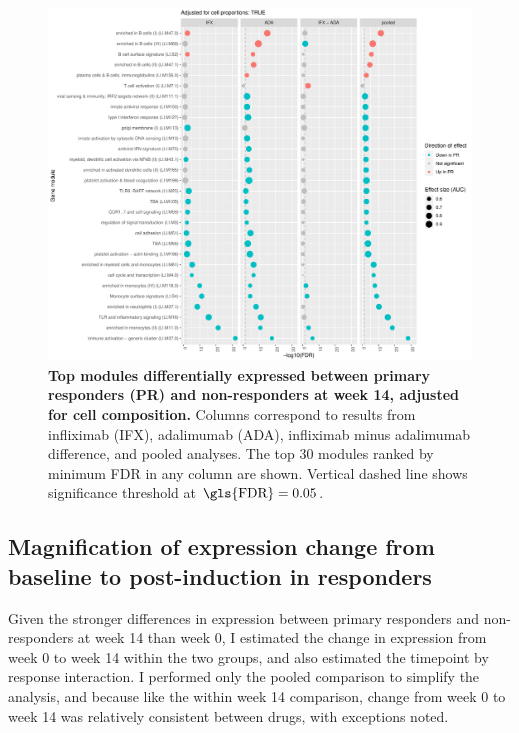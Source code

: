 \begin{figure}
    \centering
    \includegraphics[width=1.0\textwidth,page=1]{mainmatter/figures/chapter_04/plot_gene_set_enrichment.tmodCERNO_panelplot_reversed_C_3RI_3NI,C_3RA_3NA,C_(3RI_3NI)_(3RA_3NA),C_3R_3N.cell_prop_correction_TRUE.pdf}
    \caption{
        \textbf{Top modules differentially expressed between primary responders (PR) and non-responders at week 14, adjusted for cell composition.}
        Columns correspond to results from infliximab (IFX), adalimumab (ADA), infliximab minus adalimumab difference, and pooled analyses. 
        The top 30 modules ranked by minimum \gls{FDR} in any column are shown. Vertical dashed line shows significance threshold at $\text{\gls{FDR}} = 0.05$.
    }
    \label{fig:multipants_dge_panelPlot_week_14_R_N_cellPropT}
\end{figure}

\subsection{Magnification of expression change from baseline to post-induction in responders}

Given the stronger differences in expression between primary responders and non-responders at week 14 than week 0,
I estimated the change in expression from week 0 to week 14 within the two groups, and also estimated the timepoint by response interaction.
I performed only the pooled comparison to simplify the analysis, and because like the within week 14 comparison, change from week 0 to week 14 was relatively consistent between drugs, with exceptions noted.

